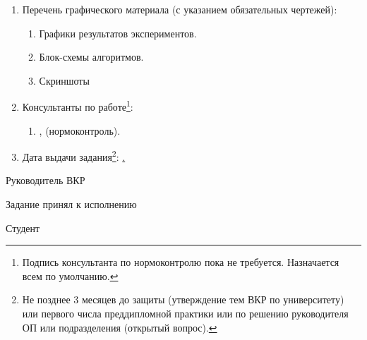 \begin{enumerate}[1.]
\begin{enumerate}[label=\theenumi\arabic*.]
	\end{enumerate}
	\item Перечень графического материала (с указанием обязательных чертежей): 
	\begin{enumerate}[label=\theenumi\arabic*.]
		\item Графики результатов экспериментов.
		\item Блок-схемы алгоритмов.
		\item Скриншоты
	\end{enumerate}	
		\item Консультанты по работе\footnote{Подпись консультанта по нормоконтролю пока не требуется. Назначается всем по умолчанию.}:
		\begin{enumerate}[label=\theenumi\arabic*.] 
		\item
		{\emakefirstuc{\ConsultantNormDegree}, \ConsultantNorm{} (нормоконтроль).} %
	\end{enumerate}
		\item Дата выдачи задания\footnote{Не позднее 3 месяцев до защиты (утверждение тем ВКР по университету) или первого числа преддипломной практики или по решению руководителя ОП или подразделения (открытый вопрос).}: \uline{\thesisStartDate.}
\end{enumerate}

\intervalS%

Руководитель ВКР \uline{\hspace*{0.1\textheight} \Supervisor}


\intervalS%



\intervalS%


Задание принял к исполнению \uline{\thesisStartDate}

\intervalS%

Студент \uline{\hspace*{0.1\textheight}  \Author}



